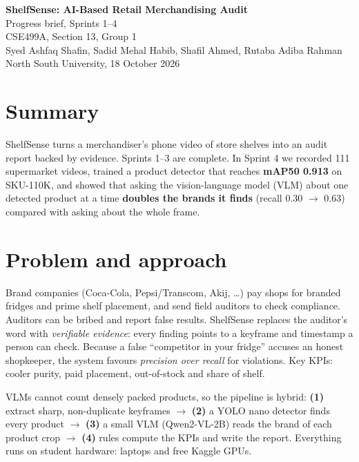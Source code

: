\documentclass[10pt,a4paper]{article}
\begin{document}
\begin{center}
{\LARGE\bfseries ShelfSense: AI-Based Retail Merchandising Audit}\\[4pt]
{\large Progress brief, Sprints 1--4}\\[6pt]
CSE499A, Section 13, Group 1\\
Syed Ashfaq Shafin, Sadid Mehal Habib, Shafil Ahmed, Rutaba Adiba Rahman\\
North South University, 18 October 2026
\end{center}

\section*{Summary}
ShelfSense turns a merchandiser's phone video of store shelves into an audit report backed by
evidence. Sprints 1--3 are complete. In Sprint 4 we recorded 111 supermarket videos, trained a
product detector that reaches \textbf{mAP50 0.913} on SKU-110K, and showed that asking the
vision-language model (VLM) about one detected product at a time \textbf{doubles the brands it
finds} (recall 0.30 $\rightarrow$ 0.63) compared with asking about the whole frame.

\section*{Problem and approach}
Brand companies (Coca-Cola, Pepsi/Transcom, Akij, \dots) pay shops for branded fridges and prime
shelf placement, and send field auditors to check compliance. Auditors can be bribed and report
false results. ShelfSense replaces the auditor's word with \emph{verifiable evidence}: every finding
points to a keyframe and timestamp a person can check. Because a false ``competitor in your
fridge'' accuses an honest shopkeeper, the system favours \emph{precision over recall} for
violations. Key KPIs: cooler purity, paid placement, out-of-stock and share of shelf.

VLMs cannot count densely packed products, so the pipeline is hybrid:
\textbf{(1)} extract sharp, non-duplicate keyframes $\rightarrow$
\textbf{(2)} a YOLO nano detector finds every product $\rightarrow$
\textbf{(3)} a small VLM (Qwen2-VL-2B) reads the brand of each product crop $\rightarrow$
\textbf{(4)} rules compute the KPIs and write the report.
Everything runs on student hardware: laptops and free Kaggle GPUs.
\end{document}
